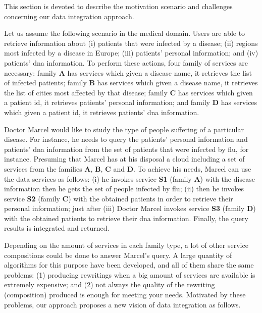 This section is devoted to describe the motivation scenario and challenges
concerning our data integration approach.
%

Let us assume the following scenario in the medical domain. 
Users are able to retrieve information about (i) patients that were infected by a disease; 
(ii) regions most infected by a disease in Europe; 
(iii) patients' personal information; and 
(iv) patients' dna information.
To perform these actions, four family of services are necessary: family
\textbf{A} has services which given a disease name, it retrieves the list
of infected patients; family \textbf{B} has services which given a disease name,
it retrieves the list of cities most affected by that disease; family \textbf{C}
has services which given a patient id, it retrieves patients' personal
information; and family \textbf{D} has services which given a patient id, it
retrieves patients' dna information. 

Doctor Marcel would like to study the type of people suffering of a
particular disease. For instance, he needs to query the patients' personal
information and patients' dna information from the set of patients that were
infected by flu, for instance. Presuming that Marcel has at his disposal a cloud
including a set of services from the families \textbf{A}, \textbf{B}, \textbf{C} and \textbf{D}. To achieve
his needs, Marcel can use the data services as follows: (i) he invokes service
\textbf{S1} (family \textbf{A}) with the disease information then he gets the
set of people infected by flu; (ii) then he invokes service \textbf{S2} (family
\textbf{C}) with the obtained patients in order to retrieve their personal
information; just after (iii) Doctor Marcel invokes service \textbf{S3} (family
\textbf{D}) with the obtained patients to retrieve their dna information.
Finally, the query results is integrated and returned.

Depending on the amount of services in each family type, a lot of other service
compositions could be done to answer Marcel's query. A large quantity of
algorithms for this purpose have been developed, and all of them share the same
problems: (1) producing rewritings when a big amount of services are available
is extremely expensive; and (2) not always the quality of the rewriting (composition) produced is enough for meeting your needs.
Motivated by these problems, our approach proposes a new vision of data
integration as follows.

